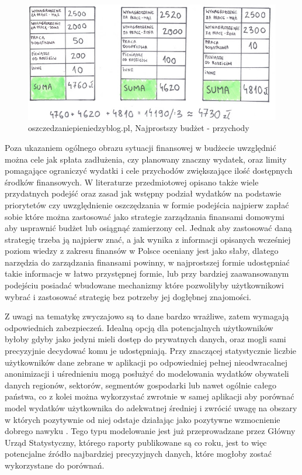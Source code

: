\documentclass[a4paper, 10pt, twoside, openright]{report}
\begin{document}
\begin{large}
\begin{figure}[H]           %
    \centering
    \includegraphics[width=12cm]{figures/oszczedzaniepieniedzyblog-pl_przychody.jpg}
    \caption{oszczedzaniepieniedzyblog.pl, Najprostszy budżet - przychody}
    \label{fig:prostybudżetprzychody}
\end{figure}

{Poza ukazaniem ogólnego obrazu sytuacji finansowej w budżecie uwzględnić można 
cele jak spłata zadłużenia, czy planowany znaczny wydatek, oraz limity 
pomagające ograniczyć wydatki i cele przychodów zwiększające ilość dostępnych 
środków finansowych. W literaturze przedmiotowej opisano także wiele przydatnych
 podejść oraz zasad jak wstępny podział wydatków na podstawie 
priorytetów \cite{najbogatszyczlowiekwbabilonie}\cite{budzetdomowypodkontrola} 
czy uwzględnienie oszczędzania w formie podejścia najpierw zapłać sobie 
\cite{najbogatszyczlowiekwbabilonie}\cite{finansowaforteca} które można 
zastosować jako strategie zarządzania finansami domowymi aby usprawnić budżet 
lub osiągnąć zamierzony cel. Jednak aby zastosować daną strategię trzeba ją 
najpierw znać, a jak wynika z informacji opisanych wcześniej poziom wiedzy z 
zakresu finansów w Polsce oceniany jest jako słaby, dlatego narzędzia do 
zarządzania finansami powinny, w najprostszej formie udostępniać takie 
informacje w łatwo przystępnej formie, lub przy bardziej zaawansowanym podejściu
 posiadać wbudowane mechanizmy które pozwoliłyby użytkownikowi wybrać i 
zastosować strategię bez potrzeby jej dogłębnej znajomości.}

{Z uwagi na tematykę zwyczajowo są to dane bardzo wrażliwe, zatem wymagają 
odpowiednich zabezpieczeń. Idealną opcją dla potencjalnych użytkowników byłoby 
gdyby jako jedyni mieli dostęp do prywatnych danych, oraz mogli sami precyzyjnie
 decydować komu je udostępniają. Przy znaczącej statystycznie liczbie 
użytkowników dane zebrane w aplikacji po odpowiedniej pełnej nieodwracalnej 
anonimizacji i uśrednieniu mogą posłużyć do modelowania wydatków obywateli 
danych regionów, sektorów, segmentów gospodarki lub nawet ogólnie całego 
państwa, co z kolei można wykorzystać zwrotnie w samej aplikacji aby porównać 
model wydatków użytkownika do adekwatnej średniej i zwrócić uwagę na obszary w 
których pozytywnie od niej odstaje działając jako pozytywne wzmocnienie 
dobrego nawyku \cite{pozytywnewzmocnienie}. Tego typu modelowanie jest już 
przeprowadzane przez Główny Urząd Statystyczny, którego raporty publikowane są 
co roku, jest to więc potencjalne źródło najbardziej precyzyjnych danych, które 
mogłoby zostać wykorzystane do porównań.}



\end{large}
\end{document}
